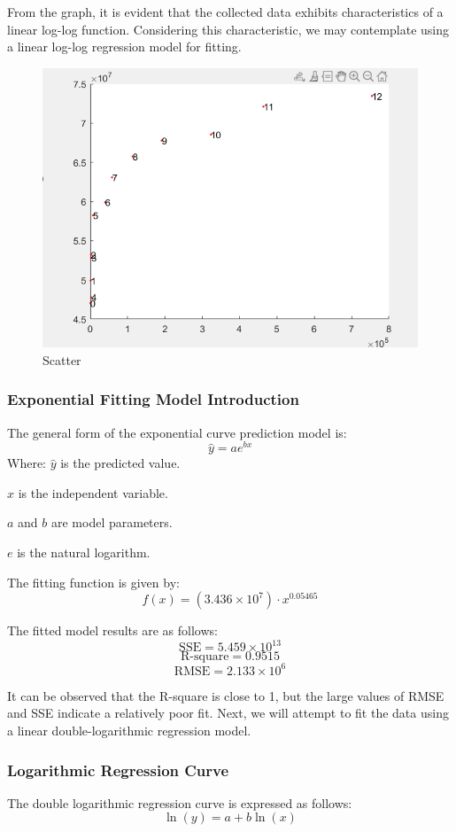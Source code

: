 \documentclass{apmcmthesis}
\begin{document}
From the graph, it is evident that the collected data exhibits characteristics of a linear log-log function. Considering this characteristic, we may contemplate using a linear log-log regression model for fitting.
\begin{figure}[htbp]
    \centering
    \includegraphics[scale=0.5]{figures/Figure/scatter.png}
    \caption{Scatter}
\end{figure}


\subsubsection{Exponential Fitting Model Introduction}
The general form of the exponential curve prediction model is:
\[ \hat{y} = ae^{bx} \]
Where:
\( \hat{y} \) is the predicted value.

\( x \) is the independent variable.

\( a \) and \( b \) are model parameters.

\( e \) is the natural logarithm.

\noindent The fitting function is given by:
\[ f(x) = (3.436 \times 10^7) \cdot x^{0.05465} \]

The fitted model results are as follows:
\[ \text{SSE} = 5.459 \times 10^{13} \]
\[ \text{R-square} = 0.9515 \]
\[ \text{RMSE} = 2.133 \times 10^6 \]

It can be observed that the R-square is close to 1, but the large values of RMSE and SSE indicate a relatively poor fit. Next, we will attempt to fit the data using a linear double-logarithmic regression model.

\subsubsection{Logarithmic Regression Curve }
The double logarithmic regression curve is expressed as follows:
\[ \ln(y) = a + b \ln(x) \]
\end{document}
